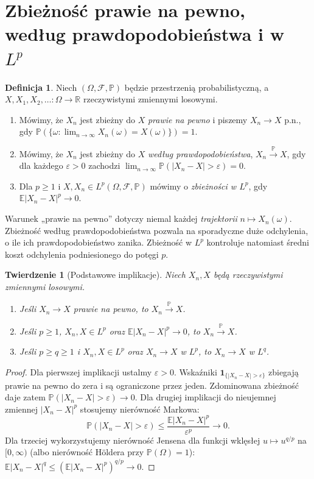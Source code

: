 \documentclass[11pt,a4paper,oneside]{report}
\numberwithin{equation}{chapter}
\theoremstyle{plain}
\newtheorem{twierdzenie}{Twierdzenie}[chapter]
\theoremstyle{definition}
\newtheorem{definicja}{Definicja}[chapter]
\theoremstyle{remark}
\newcommand{\R}{\mathbb{R}}
\newcommand{\Prob}{\mathbb{P}}
\newcommand{\E}{\mathbb{E}}
\newcommand{\ind}[1]{\mathbf{1}_{#1}}
\begin{document}
\section{Zbieżność prawie na pewno, według prawdopodobieństwa i w~\texorpdfstring{$L^p$}{Lp}}

\begin{definicja}
Niech $(\Omega,\mathcal F,\Prob)$ będzie przestrzenią
probabilistyczną, a $X,X_1,X_2,\ldots:\Omega\to\R$
rzeczywistymi zmiennymi losowymi.
\begin{enumerate}
\item Mówimy, że $X_n$ jest zbieżny do $X$ \emph{prawie na pewno}
 i piszemy $X_n\to X$ p.n., gdy
 $\Prob(\{\omega:\lim_{n\to\infty}X_n(\omega)=X(\omega)\})=1$.
\item Mówimy, że $X_n$ jest zbieżny do $X$
 \emph{według prawdopodobieństwa}, $X_n\xrightarrow{\Prob}X$,
 gdy dla każdego $\varepsilon>0$ zachodzi
 $\lim_{n\to\infty}\Prob(|X_n-X|>\varepsilon)=0$.
\item Dla $p\geq1$ i $X,X_n\in L^p(\Omega,\mathcal F,\Prob)$
 mówimy o \emph{zbieżności w $L^p$}, gdy
 $\E|X_n-X|^p\to0$.
\end{enumerate}
\end{definicja}

Warunek „prawie na pewno” dotyczy niemal każdej
\emph{trajektorii} $n\mapsto X_n(\omega)$.
Zbieżność według prawdopodobieństwa pozwala na sporadyczne
duże odchylenia, o ile ich prawdopodobieństwo zanika.
Zbieżność w $L^p$ kontroluje natomiast średni koszt
odchylenia podniesionego do potęgi $p$.

\begin{twierdzenie}[Podstawowe implikacje]
Niech $X_n,X$ będą rzeczywistymi zmiennymi losowymi.
\begin{enumerate}
\item Jeśli $X_n\to X$ prawie na pewno, to
 $X_n\xrightarrow{\Prob}X$.
\item Jeśli $p\geq1$, $X_n,X\in L^p$ oraz
 $\E|X_n-X|^p\to0$, to $X_n\xrightarrow{\Prob}X$.
\item Jeśli $p\geq q\geq1$ i $X_n,X\in L^p$ oraz
 $X_n\to X$ w $L^p$, to $X_n\to X$ w $L^q$.
\end{enumerate}
\end{twierdzenie}
\begin{proof}
Dla pierwszej implikacji ustalmy $\varepsilon>0$.
Wskaźniki $\ind{\{|X_n-X|>\varepsilon\}}$ zbiegają
prawie na pewno do zera i są ograniczone przez jeden.
Zdominowana zbieżność daje zatem
$\Prob(|X_n-X|>\varepsilon)\to0$.
Dla drugiej implikacji do nieujemnej zmiennej
$|X_n-X|^p$ stosujemy nierówność Markowa:
\[
\Prob(|X_n-X|>\varepsilon)
\leq\frac{\E|X_n-X|^p}{\varepsilon^p}\longrightarrow0.
\]
Dla trzeciej wykorzystujemy nierówność Jensena
dla funkcji wklęsłej $u\mapsto u^{q/p}$ na
$[0,\infty)$ (albo nierówność H\"oldera przy
$\Prob(\Omega)=1$):
$\E|X_n-X|^q\leq(\E|X_n-X|^p)^{q/p}\to0$.
\end{proof}
\end{document}
